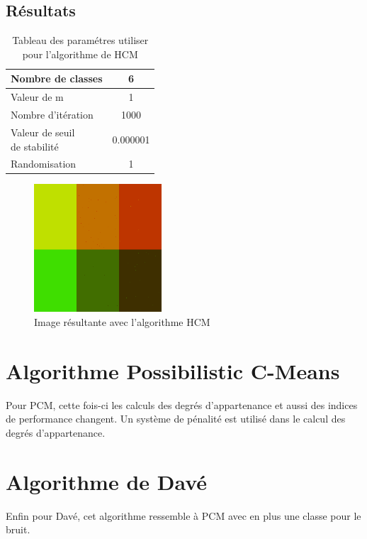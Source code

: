 \documentclass[a4paper,11pt]{article}
\begin{document}
\subsection{Résultats}

\begin{table}[H]
  \begin{center}
    \begin{tabular}{|l|c|}
      \hline
      Nombre de classes & 6 \\
      \hline
      Valeur de m & 1 \\
      \hline
      Nombre d'itération & 1000 \\
      \hline
      \shortstack{ Valeur de seuil \\ de stabilité }  & 0.000001 \\
      \hline
      Randomisation & 1 \\
      \hline
    \end{tabular}
    \caption{Tableau des paramétres utiliser pour l'algorithme de HCM}
  \end{center}
\end{table}


\begin{figure}[H]
  \begin{center} 
    \includegraphics[width=180px]{../img/segHCM.png}
    \caption{Image résultante avec l'algorithme HCM}
  \end{center}
\end{figure}

\section{Algorithme Possibilistic C-Means}

Pour PCM, cette fois-ci les calculs des degrés d'appartenance et aussi 
des indices de performance changent. Un système de pénalité est utilisé 
dans le calcul des degrés d'appartenance.

\section{Algorithme de Davé}
Enfin pour Davé, cet algorithme ressemble à PCM avec en plus une 
classe pour le bruit.
\end{document}
